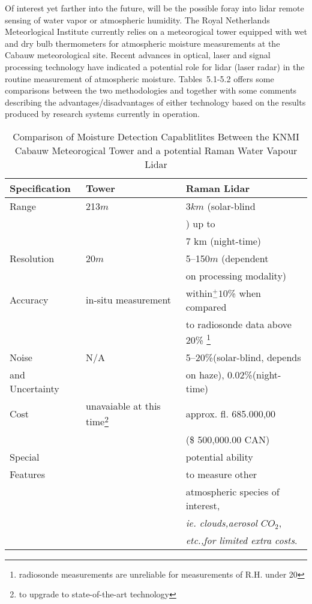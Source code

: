 Of interest yet farther into the future, will be the possible
foray into lidar remote sensing of water vapor or atmospheric humidity.
The Royal Netherlands Meteorlogical Institute currently relies on a 
meteorogical tower equipped with wet and dry bulb thermometers for 
atmospheric moisture measurements at the Cabauw meteorological site. 
Recent advances in optical, laser and signal processing technology 
have indicated a potential role for lidar (laser radar) in the routine 
measurement of atmospheric moisture. 
Tables~{5.1-5.2} offers some comparisons between 
the two methodologies and together with some comments 
describing the advantages/disadvantages of either technology based on the
results produced by research systems currently in operation. 

\begin{table}
\caption{Comparison of Moisture Detection Capablitlites Between the KNMI
Cabauw Meteorogical Tower and a potential Raman Water Vapour Lidar}
\begin{center}
\begin{tabular}{|l||l|l|}
\hline
Specification &	Tower &	Raman Lidar \\
\hline
\hline
Range &	213$m$	& 3$km$ (solar-blind\\
&& \cite{drrc}) up to\\ 
&& 7 km (night-time\cite{dnwshmraf}\cite{shmdw})\\
\hline
Resolution & 20$m$ & 5--150$m$ (dependent\\ 
&& on processing modality) \\
\hline
Accuracy & in-situ measurement & within$^{+}_{-}10$\%  
when compared\\
&&to radiosonde data above 20\% \footnote{radiosonde 
measurements are unreliable for measurements of R.H. under 20}\\
\hline
Noise & N/A & 5--20\%(solar-blind, depends\\ 
and Uncertainty & &on haze), 
0.02\%(night-time)\\
\hline
Cost & unavaiable at this time\footnote{to upgrade 
to state-of-the-art technology} & 
approx. fl. 685.000,00\\ 
&&(\$ 500,000.00 CAN)\cite{bs}\\
\hline
Special & & potential ability\\ 
Features & & to measure other \\
&& atmospheric species
of interest,\\
&& {\em ie. clouds,aerosol $CO_{2}$},\\  
&& {\em etc.,for limited extra costs}.\\
\hline
\end{tabular}
\end{center}
\end{table}

